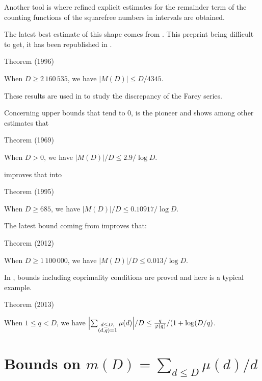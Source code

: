 Another tool is 
\cite{Cohen-Dress*88}
where refined explicit estimates for the remainder term of the counting
functions of the squarefree numbers in intervals are obtained.


The latest best estimate of this shape comes from
\cite{Cohen-Dress-ElMarraki*96}.
This preprint being difficult to get, it has been republished in
\cite{Cohen-Dress-ElMarraki*07}.
\begin{thm}{Theorem (1996)}

When $D\ge 2\,160\,535$, we have $|M(D)|\le D/4345$.
\end{thm}

These results are used in
\cite{Dress*99}
to study the discrepancy of the Farey series.


Concerning upper bounds that tend to $0$, 
\cite{Schoenfeld*69} is the pioneer
and shows among other estimates that 
\begin{thm}{Theorem (1969)}

When $D>0$, we have $|M(D)|/D\le 2.9/\log D$.
\end{thm}

\cite{ElMarraki*95} improves that
into
\begin{thm}{Theorem (1995)}

When $D\ge 685$, we have $|M(D)|/D\le 0.10917/\log D$.
\end{thm}

The latest bound coming from
\cite{Ramare*12-2} improves that:
\begin{thm}{Theorem (2012)}

When $D\ge 1\,100\,000$, we have $|M(D)|/D\le 0.013/\log D$.
\end{thm}


In
\cite{Ramare*12-5},
bounds including coprimality conditions are proved and here is a
typical example.
\begin{thm}{Theorem (2013)}

  When $1\le q < D$, we have
                $\Bigl|\sum_{\substack{ d\le D, \\
                (d,q)=1}}\mu(d)\Bigr|/D\le
                \frac{q}{\varphi(q)}/(1+\log (D/q)$.
\end{thm}








\section{Bounds on $m(D)=\sum_{d\le D}\mu(d)/d$
}


